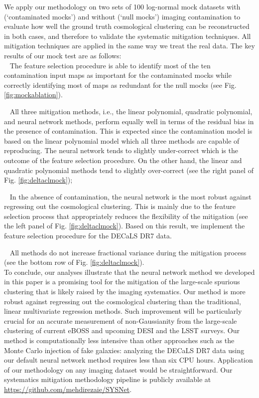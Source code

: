 \documentclass[fleqn, usenatbib]{mnras}
\begin{document}
We apply our methodology on two sets of 100 log-normal mock datasets with (`contaminated mocks') and without (`null mocks') imaging contamination  to evaluate how well the ground truth cosmological clustering can be reconstructed in both cases, and therefore to validate the systematic mitigation techniques. All mitigation techniques are applied in the same way we treat the real data. The key results of our mock test are as follows:\\

\textbullet ~ The feature selection procedure is able to identify most of the ten contamination input maps as important for the contaminated mocks while correctly identifying most of maps as redundant for the null mocks (see Fig. \ref{fig:mockablation}).

\textbullet ~    All three mitigation methods, i.e., the linear polynomial, quadratic polynomial, and neural network methods, perform equally well in terms of the residual bias in the presence of contamination. This is  expected since the contamination model is based on the linear polynomial model which all three methods are capable of reproducing. The neural network tends to slightly under-correct which is the outcome of the feature selection procedure. On the other hand, the linear and quadratic polynomial methods tend to slightly over-correct (see the right panel of Fig. \ref{fig:deltaclmock});

\textbullet ~    In the absence of contamination, the neural network is the most robust against regressing out the cosmological clustering. This is mainly due to the feature selection process that appropriately reduces the flexibility of the mitigation (see the left panel of Fig. \ref{fig:deltaclmock}). Based on this result, we implement the feature selection procedure for the DECaLS DR7 data.
    
\textbullet ~ All methods do not increase fractional variance during the mitigation process (see the bottom row of Fig. \ref{fig:deltaclmock}).\\


To conclude, our analyses illustrate that the neural network method we developed in this paper is a promising tool for the mitigation of the large-scale spurious clustering that is likely raised by the imaging systematics. Our method is more robust against regressing out the cosmological clustering than the traditional, linear multivariate regression methods. Such improvement will be particularly crucial for an accurate measurement of non-Gaussianity from the large-scale clustering of current eBOSS and upcoming DESI and the LSST surveys. Our method is computationally less intensive than other approaches such as the Monte Carlo injection of fake galaxies: analyzing the DECaLS DR7 data using our default neural network method requires less than six CPU hours. Application of our methodology on any imaging dataset would be straightforward. Our systematics mitigation methodology pipeline is publicly available at \url{https://github.com/mehdirezaie/SYSNet}.\\
\end{document}
